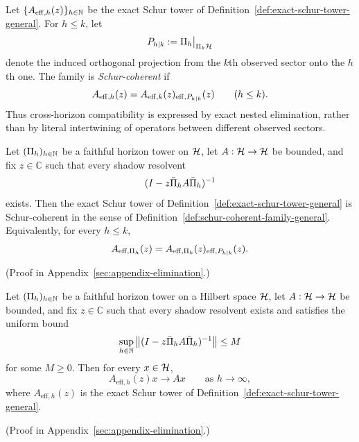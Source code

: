 \begin{definition}
\label{def:schur-coherent-family-general}
Let $\{A_{\mathrm{eff},h}(z)\}_{h\in\mathbb{N}}$ be the exact Schur tower of
Definition~\ref{def:exact-schur-tower-general}. For $h\le k$, let
\[
P_{h\mid k}:=\Pi_{h}\big|_{\Pi_{k}\mathcal{H}}
\]
denote the induced orthogonal projection from the $k$th observed sector onto
the $h$th one. The family is \emph{Schur-coherent} if
\[
A_{\mathrm{eff},h}(z)
=
A_{\mathrm{eff},k}(z)_{\mathrm{eff},P_{h\mid k}}(z)
\qquad (h\le k).
\]
Thus cross-horizon compatibility is expressed by exact nested elimination,
rather than by literal intertwining of operators between different observed
sectors.
\end{definition}

\begin{theorem}
\label{thm:exact-schur-coherence-general}
Let $(\Pi_{h})_{h\in\mathbb{N}}$ be a faithful horizon tower on $\mathcal{H}$, let
$A:\mathcal{H}\to\mathcal{H}$ be bounded, and fix
$z\in\mathbb{C}$ such that every shadow resolvent
\[
(I-z\bar{\Pi}_{h}A\bar{\Pi}_{h})^{-1}
\]
exists. Then the exact Schur tower of
Definition~\ref{def:exact-schur-tower-general} is Schur-coherent in the sense
of Definition~\ref{def:schur-coherent-family-general}. Equivalently, for every
$h\le k$,
\[
A_{\mathrm{eff},\Pi_{h}}(z)
=
A_{\mathrm{eff},\Pi_{k}}(z)_{\mathrm{eff},P_{h\mid k}}(z).
\]
\end{theorem}

(Proof in Appendix~\ref{sec:appendix-elimination}.)

\begin{theorem}
\label{thm:schur-tower-strong-recovery-general}
Let $(\Pi_{h})_{h\in\mathbb{N}}$ be a faithful horizon tower on a Hilbert space
$\mathcal{H}$, let $A:\mathcal{H}\to\mathcal{H}$ be bounded, and fix
$z\in\mathbb{C}$ such that every shadow resolvent exists and satisfies the
uniform bound
\[
\sup_{h\in\mathbb{N}}
\left\|
(I-z\bar{\Pi}_{h}A\bar{\Pi}_{h})^{-1}
\right\|
\le M
\]
for some $M\ge 0$. Then for every $x\in\mathcal{H}$,
\[
A_{\mathrm{eff},h}(z)x \to Ax
\qquad\text{as }h\to\infty,
\]
where $A_{\mathrm{eff},h}(z)$ is the exact Schur tower of
Definition~\ref{def:exact-schur-tower-general}.
\end{theorem}

(Proof in Appendix~\ref{sec:appendix-elimination}.)

